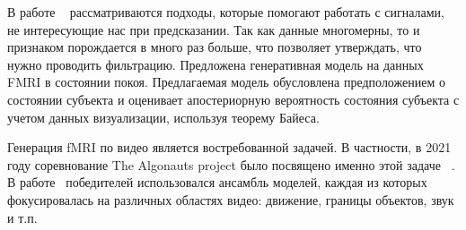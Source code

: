 \documentclass{article}
\begin{document}
В работе ~\cite{matsubara2019deep} рассматриваются подходы, которые помогают работать с сигналами, не интересующие нас при предсказании. Так как данные многомерны, то и признаком порождается в много раз больше, что позволяет утверждать, что нужно проводить фильтрацию. Предложена генеративная модель на данных FMRI в состоянии покоя. Предлагаемая модель обусловлена предположением о состоянии субъекта и оценивает апостериорную вероятность состояния субъекта с учетом данных визуализации, используя теорему Байеса.

Генерация fMRI по видео является востребованной задачей. В частности, в 2021 году соревнование The Algonauts project было посвящено именно этой задаче ~\cite{DBLP:journals/corr/abs-2104-13714}. В работе ~\cite{Yang2021.08.24.457581}победителей использовался ансамбль моделей, каждая из которых фокусировалась на различных областях видео: движение, границы объектов, звук и т.п.





 
 


 
\end{document}
